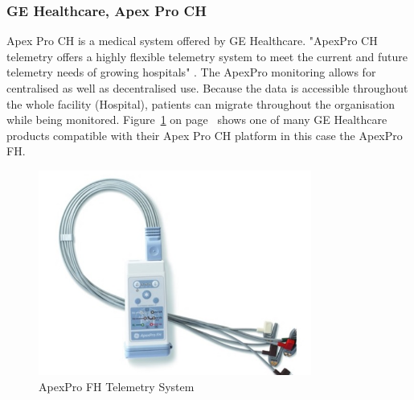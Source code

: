 \documentclass[12pt,]{article}
\numberwithin{figure}{section}
\begin{document}
\subsubsection{GE Healthcare, Apex Pro CH}
Apex Pro CH is a medical system offered by GE Healthcare. "ApexPro CH telemetry offers a highly flexible telemetry system to meet the current and future telemetry needs of growing hospitals" \cite{GEH}. The ApexPro monitoring allows for centralised as well as decentralised use. Because the data is accessible throughout the whole facility (Hospital), patients can migrate throughout the organisation while being monitored. Figure~\ref{fig:9} on page~\pageref{fig:9} shows one of many GE Healthcare products compatible with their Apex Pro CH platform in this case the ApexPro FH.
\begin{figure}[h]
  	\begin{center}
    	\includegraphics[width=0.8\textwidth]{9}
  	\end{center}
  	\caption{ApexPro FH Telemetry System \cite{GEH}}
	\label{fig:9}
\end{figure}
\end{document}
